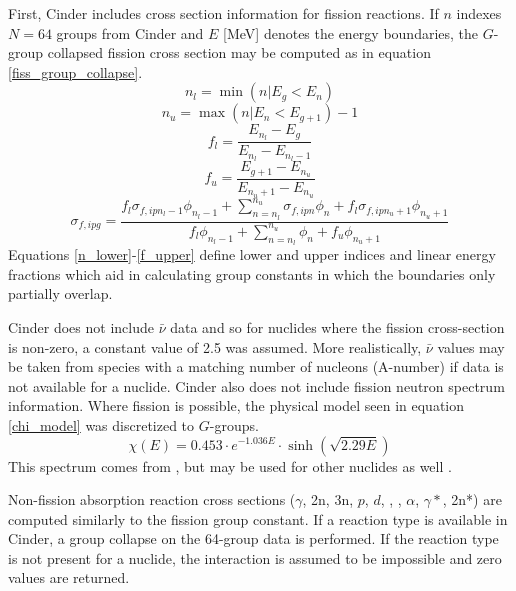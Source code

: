 First, Cinder includes cross section information for fission reactions.  
If $n$ indexes $N=64$ groups from Cinder and $E$ [MeV] denotes the energy boundaries, 
the $G$-group collapsed fission cross section may be computed as in equation \ref{fiss_group_collapse}.
\begin{equation}
\label{n_lower}
n_l = \min(n|E_g<E_n)
\end{equation}
\begin{equation}
\label{n_upper}
n_u = \max(n|E_n<E_{g+1}) - 1
\end{equation}
\begin{equation}
\label{f_lower}
f_l = \frac{E_{n_l} - E_g}{E_{n_l} - E_{n_l-1}}
\end{equation}
\begin{equation}    
\label{f_upper}
f_u = \frac{E_{g+1} - E_{n_u}}{E_{n_u+1} - E_{n_u}}
\end{equation}
\begin{equation}
\label{fiss_group_collapse}
\sigma_{f,ipg} = \frac{f_l\sigma_{f,ipn_l-1}\phi_{n_l-1} + \sum_{n=n_l}^{n_u} \sigma_{f,ipn}\phi_n + f_l\sigma_{f,ipn_u+1}\phi_{n_u+1}}{f_l\phi_{n_l-1} + \sum_{n=n_l}^{n_u} \phi_n  + f_u\phi_{n_u+1}}
\end{equation}
Equations \ref{n_lower}-\ref{f_upper} define lower and upper indices and linear energy fractions
which aid in calculating group constants in which the boundaries only partially overlap.

Cinder does not include $\bar{\nu}$ data and so for nuclides where the fission cross-section is 
non-zero, a constant value of 2.5 was assumed.  
More realistically, $\bar{\nu}$ values may be taken from species with a matching number of nucleons (A-number)
if data is not available for a nuclide.
Cinder also does not include fission neutron 
spectrum information.  Where fission is possible, the physical model seen in equation \ref{chi_model}
was discretized to $G$-groups.
\begin{equation}
\label{chi_model}
\chi(E) = 0.453 \cdot e^{-1.036E} \cdot \sinh\left(\sqrt{2.29E}\right)
\end{equation}
This spectrum comes from , but may be used for other nuclides as well \cite{Lamarsh2002}.

Non-fission absorption reaction cross sections ($\gamma$, 2n, 3n, $p$, $d$, , , 
$\alpha$, $\gamma*$, 2n*) are computed similarly to the fission group constant.  If a reaction 
type is available in Cinder, a group collapse on the 64-group data is performed.  If the reaction 
type is not present for a nuclide, the interaction is assumed to be impossible and zero values
are returned.

